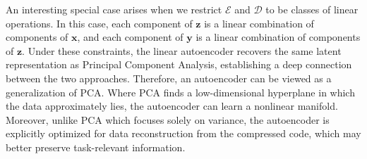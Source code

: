 An interesting special case arises when we restrict $\mathcal{E}$ and $\mathcal{D}$ to be classes of linear operations. In this case, each component of $\mathbf{z}$ is a linear combination of components of $\mathbf{x}$, and each component of $\mathbf{y}$ is a linear combination of components of $\mathbf{z}$. Under these constraints, the linear autoencoder recovers the same latent representation as Principal Component Analysis, establishing a deep connection between the two approaches. Therefore, an autoencoder can be viewed as a generalization of PCA. Where PCA finds a low-dimensional hyperplane in which the data approximately lies, the autoencoder can learn a nonlinear manifold. Moreover, unlike PCA which focuses solely on variance, the autoencoder is explicitly optimized for data reconstruction from the compressed code, which may better preserve task-relevant information.

